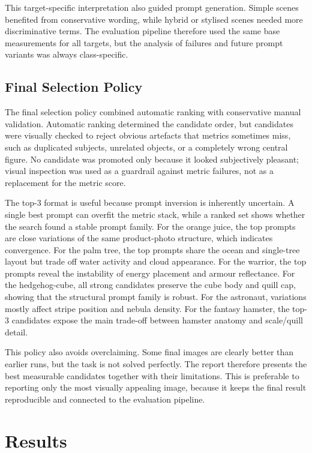 \documentclass[runningheads]{llncs}
\begin{document}
This target-specific interpretation also guided prompt generation. Simple scenes benefited from conservative wording, while hybrid or stylised scenes needed more discriminative terms. The evaluation pipeline therefore used the same base measurements for all targets, but the analysis of failures and future prompt variants was always class-specific.

\subsection{Final Selection Policy}

The final selection policy combined automatic ranking with conservative manual validation. Automatic ranking determined the candidate order, but candidates were visually checked to reject obvious artefacts that metrics sometimes miss, such as duplicated subjects, unrelated objects, or a completely wrong central figure. No candidate was promoted only because it looked subjectively pleasant; visual inspection was used as a guardrail against metric failures, not as a replacement for the metric score.

The top-3 format is useful because prompt inversion is inherently uncertain. A single best prompt can overfit the metric stack, while a ranked set shows whether the search found a stable prompt family. For the orange juice, the top prompts are close variations of the same product-photo structure, which indicates convergence. For the palm tree, the top prompts share the ocean and single-tree layout but trade off water activity and cloud appearance. For the warrior, the top prompts reveal the instability of energy placement and armour reflectance. For the hedgehog-cube, all strong candidates preserve the cube body and quill cap, showing that the structural prompt family is robust. For the astronaut, variations mostly affect stripe position and nebula density. For the fantasy hamster, the top-3 candidates expose the main trade-off between hamster anatomy and scale/quill detail.

This policy also avoids overclaiming. Some final images are clearly better than earlier runs, but the task is not solved perfectly. The report therefore presents the best measurable candidates together with their limitations. This is preferable to reporting only the most visually appealing image, because it keeps the final result reproducible and connected to the evaluation pipeline.

\section{Results}
\end{document}
